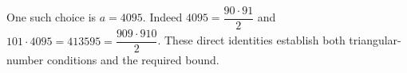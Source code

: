 One such choice is $\boxed{a=4095}$. Indeed $ 4095=\dfrac{90\cdot91}{2}$ and $ 101\cdot4095=413595=\dfrac{909\cdot910}{2}$. These direct identities establish both triangular-number conditions and the required bound.
